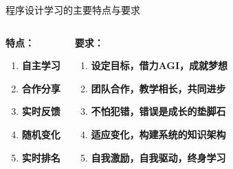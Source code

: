\documentclass[aspectratio=169]{ctexbeamer} %
\date{\today}
\begin{document}
\begin{frame}[t]{程序设计学习的主要特点与要求}
\begin{columns}
\begin{spacing}{1.5} %
{
\large
\textbf{特点：}\\
\begin{enumerate}[label={\arabic*.}]
\item \textbf{自主学习}
\item \textbf{合作分享}
\item \textbf{实时反馈}
\item \textbf{随机变化}
\item \textbf{实时排名}
\end{enumerate}
}
\end{spacing}
\begin{spacing}{1.5} %
{
\large
\textbf{要求：}\\
\begin{enumerate}[label={\arabic*.}]
\item \textbf{设定目标，借力AGI，成就梦想}
\item \textbf{团队合作，教学相长，共同进步}
\item \textbf{不怕犯错，错误是成长的垫脚石}
\item \textbf{适应变化，构建系统的知识架构}
\item \textbf{自我激励，自我驱动，终身学习}
\end{enumerate}
}
\end{spacing}
\end{columns}
\end{frame}
\end{document}
